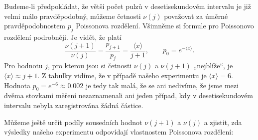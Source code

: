 \begin{mdframed}[style=mdexam]
\begin{example}
    {\centering {}
    \par}
    {\centering {}
    \par}
    \vspace{\baselineskip}
    Budeme-li předpokládat, že větší počet pulzů v desetisekundovém intervalu je již velmi málo
    pravděpodobný, můžeme četnosti \(\nu(j)\) považovat za úměrné pravděpodobnostem \(p_j\)
    Poissonova rozdělení. Všimněme si formule pro Poissonovo rozdělení podrobněji. Je vidět, že
    platí
    \begin{equation*}
      \dfrac{\nu(j + 1)}{\nu(j)} = \dfrac{p_{j+1}}{p_{j}} = \dfrac{\langle x \rangle}{j + 1},
      \qquad p_0 = e^{-\langle x \rangle}.
    \end{equation*}
    Pro hodnotu \(j\), pro kterou jsou si četnosti \(\nu(j)\) a \(\nu(j + 1)\) „nejblíže“, je
    \(\langle x \rangle \approx j + 1\). Z tabulky vidíme, že v případě našeho experimentu je
    \(\langle x \rangle = 6\). Hodnota \(p_0 = e^{-6} \approx \num{0.002}\) je tedy tak malá, že se
    ani nedivíme, že jsme mezi dvěma stovkami měření nezaznamenali ani jeden případ, kdy v
    desetisekundovém intervalu nebyla zaregistrována žádná částice.
    
    Můžeme ještě určit podíly sousedních hodnot \(\nu(j + 1)\) a \(\nu(j)\) a zjistit, zda výsledky
    našeho experimentu odpovídají vlastnostem Poissonova rozdělení:

    {\centering {}
    \par}


\end{example}
\end{mdframed}
